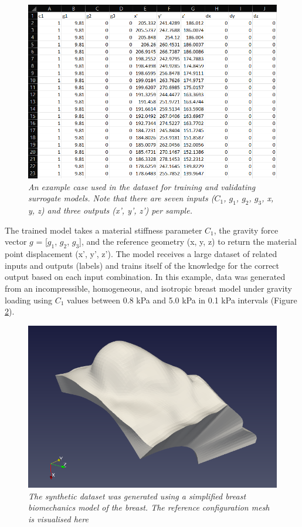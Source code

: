 \documentclass[11pt]{article}
\begin{document}
\begin{figure}
\centering
\includegraphics[scale=0.7]{Images/breast/machine_learning/training_data_structure.png}
\caption{\textit{\label{fig3}An example case used in the dataset for training and validating surrogate models. Note that there are seven inputs ($C_{1}$, $g_{1}$, $g_{2}$, $g_{3}$, x, y, z) and three outputs (x', y', z') per sample.}}
\end{figure}

The trained model takes a material stiffness parameter $C_{1}$, the gravity force vector $g$ = [$g_{1}$, $g_{2}$, $g_{3}$], and the reference geometry (x, y, z) to return the material point displacement (x', y', z'). The model receives a large dataset of related inputs and outputs (labels) and trains itself of the knowledge for the correct output based on each input combination. In this example, data was generated from an incompressible, homogeneous, and isotropic breast model under gravity loading using $C_{1}$ values between 0.8 kPa and 5.0 kPa in 0.1 kPa intervals (Figure \ref{fig4}).

\begin{figure}
\centering
\includegraphics[scale=0.7]{Images/breast/machine_learning/breast_visualisation.png}
\caption{\textit{\label{fig4}The synthetic dataset was generated using a simplified breast biomechanics model of the breast. The reference configuration mesh is visualised here}} 
\end{figure}
\end{document}
